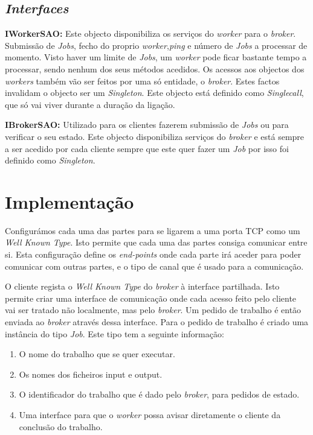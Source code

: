\documentclass[a4paper]{article}
\begin{document}
\subsection{\emph{Interfaces}}

\textbf{IWorkerSAO:}
	Este objecto disponibiliza os serviços do \emph{worker} para o \emph{broker}. Submissão de \emph{Jobs}, fecho do proprio \emph{worker},\emph{ping} e número de \emph{Jobs} a processar de momento. Visto haver um limite de \emph{Jobs}, um \emph{worker} pode ficar bastante tempo a processar, sendo nenhum dos seus métodos acedidos. Os acessos aos objectos dos \emph{workers} também vão ser feitos por uma só entidade, o \emph{broker}. Estes factos invalidam o objecto ser um \emph{Singleton}. Este objecto está definido como \emph{Singlecall}, que só vai viver durante a duração da ligação.

\textbf{IBrokerSAO:}
	Utilizado para os clientes fazerem submissão de \emph{Jobs} ou para verificar o seu estado. Este objecto disponibiliza serviços do \emph{broker} e está sempre a ser acedido por cada cliente sempre que este quer fazer um \emph{Job} por isso foi definido como \emph{Singleton}.

\section{Implementação}

Configurámos cada uma das partes para se ligarem a uma porta TCP como um \emph{Well Known Type}. Isto permite que cada uma das partes consiga comunicar entre si. Esta configuração define os \emph{end-points} onde cada parte irá aceder para poder comunicar com outras partes, e o tipo de canal que é usado para a comunicação.

O cliente regista o \emph{Well Known Type} do \emph{broker} à interface partilhada. Isto permite criar uma interface de comunicação onde cada acesso feito pelo cliente vai ser tratado não localmente, mas pelo \emph{broker}. Um pedido de trabalho é então enviada ao \emph{broker} através dessa interface.
Para o pedido de trabalho é criado uma instância do tipo \emph{Job}. Este tipo tem a seguinte informação:
\begin{enumerate}
\item O nome do trabalho que se quer executar.
\item Os nomes dos ficheiros input e output.
\item O identificador do trabalho que é dado pelo \emph{broker}, para pedidos de estado.
\item Uma interface para que o \emph{worker} possa avisar diretamente o cliente da conclusão do trabalho.
\end{enumerate}
\end{document}
